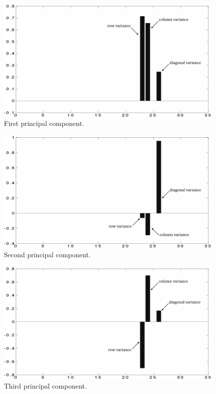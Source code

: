 \begin{figure}[H]\label{pc_1}
  \centering
  \includegraphics[width=6in]{figs/pc_1}
  \caption[First principal component.]
   {First principal component.}
\end{figure}

\begin{figure}[H]\label{pc_2}
  \centering
  \includegraphics[width=6in]{figs/pc_2}
  \caption[Second principal component.]
   {Second principal component.}
\end{figure}

\begin{figure}[H]\label{pc_3}
  \centering
  \includegraphics[width=6in]{figs/pc_3}
  \caption[Third principal component.]
   {Third principal component.}
\end{figure}

